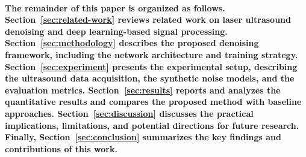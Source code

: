 \paragraph{The remainder of this paper is organized as follows. Section~\ref{sec:related-work} reviews related work on laser ultrasound denoising and deep learning-based signal processing. Section~\ref{sec:methodology} describes the proposed denoising framework, including the network architecture and training strategy. Section~\ref{sec:experiment} presents the experimental setup, describing the ultrasound data acquisition, the synthetic noise models, and the evaluation metrics. Section~\ref{sec:results} reports and analyzes the quantitative results and compares the proposed method with baseline approaches. Section~\ref{sec:discussion} discusses the practical implications, limitations, and potential directions for future research. Finally, Section~\ref{sec:conclusion} summarizes the key findings and contributions of this work.}
